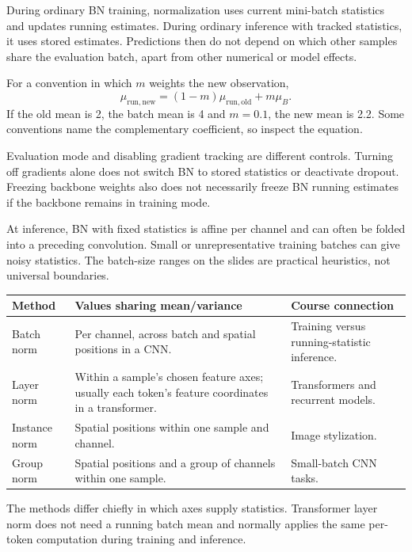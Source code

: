 During ordinary BN training, normalization uses current mini-batch statistics and updates running estimates. During ordinary inference with tracked statistics, it uses stored estimates. Predictions then do not depend on which other samples share the evaluation batch, apart from other numerical or model effects.

For a convention in which $m$ weights the new observation,
\[
\mu_{\mathrm{run,new}}=(1-m)\mu_{\mathrm{run,old}}+m\mu_B.
\]
If the old mean is 2, the batch mean is 4 and $m=0.1$, the new mean is 2.2. Some conventions name the complementary coefficient, so inspect the equation.

Evaluation mode and disabling gradient tracking are different controls. Turning off gradients alone does not switch BN to stored statistics or deactivate dropout. Freezing backbone weights also does not necessarily freeze BN running estimates if the backbone remains in training mode.

At inference, BN with fixed statistics is affine per channel and can often be folded into a preceding convolution. Small or unrepresentative training batches can give noisy statistics. The batch-size ranges on the slides are practical heuristics, not universal boundaries.

\begin{longtable}{@{}P{.22\textwidth}P{.44\textwidth}P{.24\textwidth}@{}}
\toprule Method & Values sharing mean/variance & Course connection\\\midrule\endhead
Batch norm & Per channel, across batch and spatial positions in a CNN. & Training versus running-statistic inference.\\
Layer norm & Within a sample's chosen feature axes; usually each token's feature coordinates in a transformer. & Transformers and recurrent models.\\
Instance norm & Spatial positions within one sample and channel. & Image stylization.\\
Group norm & Spatial positions and a group of channels within one sample. & Small-batch CNN tasks.\\\bottomrule
\end{longtable}
The methods differ chiefly in which axes supply statistics. Transformer layer norm does not need a running batch mean and normally applies the same per-token computation during training and inference.

